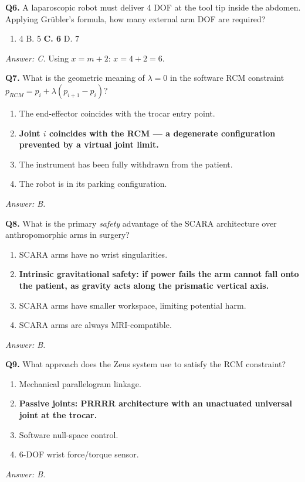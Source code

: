 \documentclass[11pt,a4paper,twoside]{report}
\begin{document}
\textbf{Q6.} A laparoscopic robot must deliver 4 DOF at the tool tip inside the abdomen. Applying Grübler's formula, how many external arm DOF are required?
\begin{enumerate}[label=\Alph*.]
    \item 4 \quad B. 5 \quad \textbf{C. 6} \quad D. 7
\end{enumerate}
\textit{Answer: C.} Using $x = m + 2$: $x = 4 + 2 = 6$.

\bigskip
\textbf{Q7.} What is the geometric meaning of $\lambda = 0$ in the software RCM constraint $p_{RCM} = p_i + \lambda(p_{i+1} - p_i)$?
\begin{enumerate}[label=\Alph*.]
    \item The end-effector coincides with the trocar entry point.
    \item \textbf{Joint $i$ coincides with the RCM — a degenerate configuration prevented by a virtual joint limit.}
    \item The instrument has been fully withdrawn from the patient.
    \item The robot is in its parking configuration.
\end{enumerate}
\textit{Answer: B.}

\bigskip
\textbf{Q8.} What is the primary \textit{safety} advantage of the SCARA architecture over anthropomorphic arms in surgery?
\begin{enumerate}[label=\Alph*.]
    \item SCARA arms have no wrist singularities.
    \item \textbf{Intrinsic gravitational safety: if power fails the arm cannot fall onto the patient, as gravity acts along the prismatic vertical axis.}
    \item SCARA arms have smaller workspace, limiting potential harm.
    \item SCARA arms are always MRI-compatible.
\end{enumerate}
\textit{Answer: B.}

\bigskip
\textbf{Q9.} What approach does the Zeus system use to satisfy the RCM constraint?
\begin{enumerate}[label=\Alph*.]
    \item Mechanical parallelogram linkage.
    \item \textbf{Passive joints: PRRRR architecture with an unactuated universal joint at the trocar.}
    \item Software null-space control.
    \item 6-DOF wrist force/torque sensor.
\end{enumerate}
\textit{Answer: B.}
\end{document}
